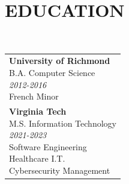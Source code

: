 \begin{minipage}[t]{\linewidth}
    
    \section*{\Large\MakeUppercase{Education}}
    \vspace{-1.5em}
    \hrulefill \\  [0.5em]
    \begin{tabularx}{\textwidth}{@{}X@{}}
        \makecell{\textbf{University of Richmond} \\ \color{slateblue}B.A. Computer Science\\ \textit{\color{slategrey}2012-2016}  \\ French Minor } \\ [3.0em]
    
        \makecell{\textbf{Virginia Tech} \\ \color{slateblue}M.S. Information Technology\\ \textit{\color{slategrey}2021-2023}  \\ Software Engineering \\ Healthcare I.T. \\ Cybersecurity Management } \\
    \end{tabularx} \\ [0.5em]
\end{minipage}